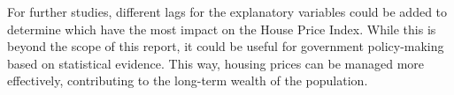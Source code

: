 \documentclass[
]{article}
\begin{document}
For further studies, different lags for the explanatory variables could
be added to determine which have the most impact on the House Price
Index. While this is beyond the scope of this report, it could be useful
for government policy-making based on statistical evidence. This way,
housing prices can be managed more effectively, contributing to the
long-term wealth of the population.
\end{document}
